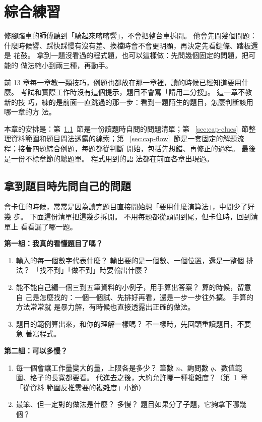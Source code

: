 \chapter{綜合練習}
\label{ch:capstone}

修腳踏車的師傅聽到「騎起來喀喀響」，不會把整台車拆開。 他會先問幾個問題：
什麼時候響、踩快踩慢有沒有差、換檔時會不會更明顯，再決定先看鏈條、踏板還是
花鼓。 拿到一題沒看過的程式題，也可以這樣做：先問幾個固定的問題，把可能的
做法縮小到兩三種，再動手。

前 13 章每一章教一類技巧，例題也都放在那一章裡，讀的時候已經知道要用什麼。
考試和實際工作時沒有這個提示，題目不會寫「請用二分搜」。 這一章不教新的技
巧，練的是前面一直跳過的那一步：看到一題陌生的題目，怎麼判斷該用哪一章的方
法。

本章的安排是：第~\ref{sec:cap-questions}~節是一份讀題時自問的問題清單；第
~\ref{sec:cap-clues}~節整理資料範圍和題目問法透露的線索；第
~\ref{sec:cap-flow}~節是一套固定的解題流程；接著四題綜合例題，每題都從判斷
開始，包括先想錯、再修正的過程。 最後是一份不標章節的總題單。 程式用到的語
法都在前面各章出現過。

\section{拿到題目時先問自己的問題}
\label{sec:cap-questions}

會卡住的時候，常常是因為讀完題目直接開始想「要用什麼演算法」，中間少了好幾
步。 下面這份清單把這幾步拆開。 不用每題都從頭問到尾，但卡住時，回到清單上
看看漏了哪一題。

\textbf{第一組：我真的看懂題目了嗎？}

\begin{enumerate}
\item 輸入的每一個數字代表什麼？ 輸出要的是一個數、一個位置，還是一整個
排法？ 「找不到」「做不到」時要輸出什麼？
\item 能不能自己編一個三到五筆資料的小例子，用手算出答案？ 算的時候，留意自
己是怎麼找的：一個一個試、先排好再看，還是一步一步往外擴。 手算的方法常常就
是暴力解，有時候也直接透露出正確的做法。
\item 題目的範例算出來，和你的理解一樣嗎？ 不一樣時，先回頭重讀題目，不要急
著寫程式。
\end{enumerate}

\textbf{第二組：可以多慢？}

\begin{enumerate}[resume]
\item 每一個會讓工作量變大的量，上限各是多少？ 筆數 $n$、詢問數 $q$、數值範
圍、格子的長寬都要看。 代進去之後，大約允許哪一種複雜度？（第~1~章「從資料
範圍反推需要的複雜度」小節）
\item 最笨、但一定對的做法是什麼？ 多慢？ 題目如果分了子題，它夠拿下哪幾個？
\end{enumerate}

